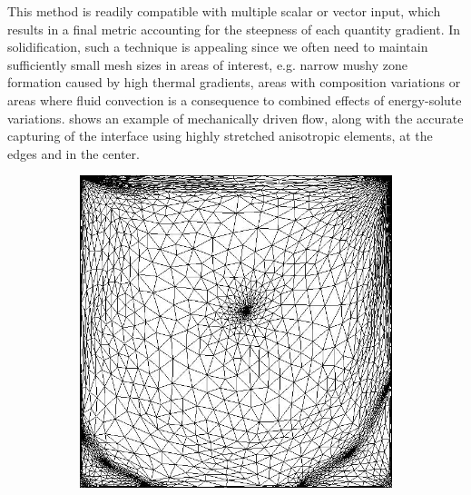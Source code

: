 This method is readily compatible with multiple scalar or vector input, which results in a final metric accounting
for the steepness of each quantity gradient. In solidification, such a technique is appealing since we often need 
to maintain sufficiently small mesh sizes in areas of interest, e.g. narrow mushy zone formation caused by high thermal gradients, areas with composition variations or
areas where fluid convection is a consequence to combined effects of energy-solute variations.  shows an example of mechanically driven flow,
along with the accurate capturing of the interface using highly stretched anisotropic elements, at the edges and in the center.


\begin{figure}[htbp]
\centering
  \begin{subfigure}[t]{0.3\textwidth}
    \centering
	\includegraphics[width=\textwidth]{Chapter2/Graphics/remesh4_1000.png}
	\caption{}
  \end{subfigure}
   \begin{subfigure}[t]{0.3\textwidth}
    \centering

\end{subfigure}
\end{figure}
